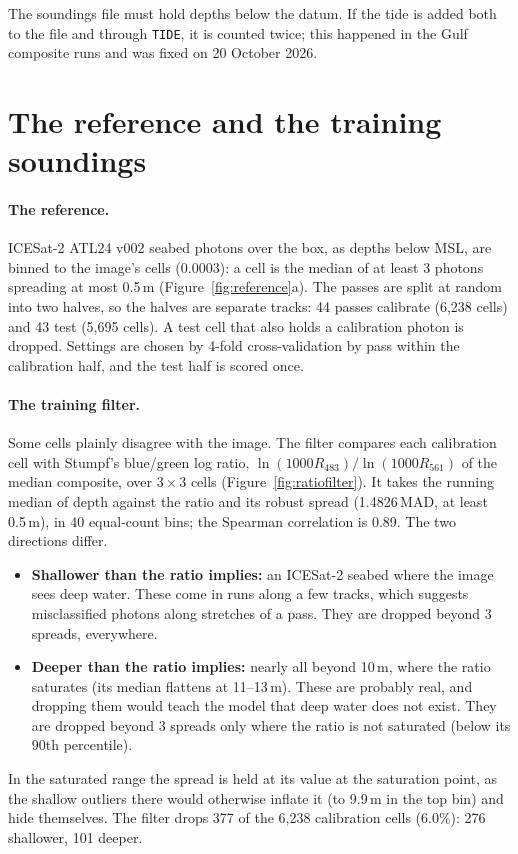 \documentclass[11pt]{article}
\numberwithin{equation}{section}
\newcommand{\code}[1]{\texttt{#1}}
\begin{document}
The soundings file must hold depths below the datum. If the tide is added both to the file and
through \code{TIDE}, it is counted twice; this happened in the Gulf composite runs and was
fixed on 20 October 2026.

\section{The reference and the training soundings}
\label{sec:reference}

\paragraph{The reference.} ICESat-2 ATL24 v002 seabed photons over the box, as depths below MSL,
are binned to the image's cells (0.0003\textdegree): a cell is the median of at least 3 photons
spreading at most 0.5\,m (Figure~\ref{fig:reference}a). The passes are split at random into two
halves, so the halves are separate tracks: 44 passes calibrate (6,238 cells) and 43 test (5,695
cells). A test cell that also holds a calibration photon is dropped. Settings are chosen by 4-fold
cross-validation by pass within the calibration half, and the test half is scored once.

\paragraph{The training filter.} Some cells plainly disagree with the image. The filter compares
each calibration cell with Stumpf's blue/green log ratio, $\ln(1000 R_{483})/\ln(1000 R_{561})$ of
the median composite, over $3\times3$ cells (Figure~\ref{fig:ratiofilter}). It takes the running
median of depth against the ratio and its robust spread (1.4826\,MAD, at least 0.5\,m), in 40
equal-count bins; the Spearman correlation is 0.89. The two directions differ.
\begin{itemize}
\item \textbf{Shallower than the ratio implies:} an ICESat-2 seabed where the image sees deep water.
  These come in runs along a few tracks, which suggests misclassified photons along stretches of a
  pass. They are dropped beyond 3 spreads, everywhere.
\item \textbf{Deeper than the ratio implies:} nearly all beyond 10\,m, where the ratio saturates (its
  median flattens at 11--13\,m). These are probably real, and dropping them would teach the model
  that deep water does not exist. They are dropped beyond 3 spreads only where the ratio is not
  saturated (below its 90th percentile).
\end{itemize}
In the saturated range the spread is held at its value at the saturation point, as the shallow
outliers there would otherwise inflate it (to 9.9\,m in the top bin) and hide themselves. The
filter drops 377 of the 6,238 calibration cells (6.0\%): 276 shallower, 101 deeper.
\end{document}
